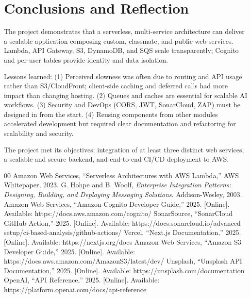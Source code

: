 \documentclass[conference]{IEEEtran}
\begin{document}
\section{Conclusions and Reflection}
The project demonstrates that a serverless, multi-service architecture can deliver a scalable application composing custom, classmate, and public web services. Lambda, API Gateway, S3, DynamoDB, and SQS scale transparently; Cognito and per-user tables provide identity and data isolation.

Lessons learned: (1) Perceived slowness was often due to routing and API usage rather than S3/CloudFront; client-side caching and deferred calls had more impact than changing hosting. (2) Queues and caches are essential for scalable AI workflows. (3) Security and DevOps (CORS, JWT, SonarCloud, ZAP) must be designed in from the start. (4) Reusing components from other modules accelerated development but required clear documentation and refactoring for scalability and security.

The project met its objectives: integration of at least three distinct web services, a scalable and secure backend, and end-to-end CI/CD deployment to AWS.

\begin{thebibliography}{00}
 Amazon Web Services, ``Serverless Architectures with AWS Lambda,'' AWS Whitepaper, 2023.
 G. Hohpe and B. Woolf, \textit{Enterprise Integration Patterns: Designing, Building, and Deploying Messaging Solutions}. Addison-Wesley, 2003.
 Amazon Web Services, ``Amazon Cognito Developer Guide,'' 2025. [Online]. Available: https://docs.aws.amazon.com/cognito/
 SonarSource, ``SonarCloud GitHub Action,'' 2025. [Online]. Available: https://docs.sonarcloud.io/advanced-setup/ci-based-analysis/github-actions/
 Vercel, ``Next.js Documentation,'' 2025. [Online]. Available: https://nextjs.org/docs
 Amazon Web Services, ``Amazon S3 Developer Guide,'' 2025. [Online]. Available: https://docs.aws.amazon.com/AmazonS3/latest/dev/
 Unsplash, ``Unsplash API Documentation,'' 2025. [Online]. Available: https://unsplash.com/documentation
 OpenAI, ``API Reference,'' 2025. [Online]. Available: https://platform.openai.com/docs/api-reference
\end{thebibliography}
\end{document}
